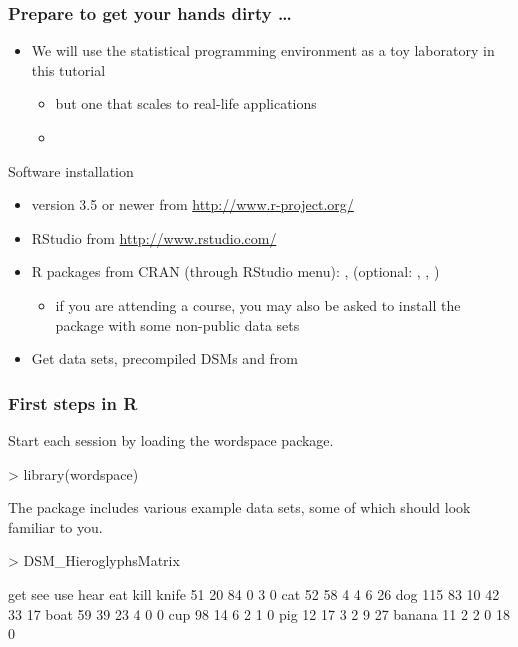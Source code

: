 \documentclass[t]{beamer} %
\begin{document}
\begin{frame}
  \frametitle{Prepare to get your hands dirty \ldots}
  
  \begin{itemize}
  \item We will use the statistical programming environment \href{http://www.r-project.org/}{} as a toy laboratory in this tutorial
    \begin{itemize}
    \item[\hand] but one that scales to real-life applications
    \item[]
    \end{itemize}
  \end{itemize}

  Software installation
  \begin{itemize}
  \item {} version 3.5 or newer from \url{http://www.r-project.org/}
  \item RStudio from \url{http://www.rstudio.com/}
  \item R packages from CRAN (through RStudio menu):
    ,  (optional: , , )
    \begin{itemize}
    \item if you are attending a course, you may also be asked to install the  package with some non-public data sets
    \end{itemize}
  \item Get data sets, precompiled DSMs and  from\\ 
  \end{itemize}
\end{frame}

\begin{frame}[fragile]
  \frametitle{First steps in R}

Start each session by loading the wordspace package.
\begin{Rcode}
> library(wordspace)
\end{Rcode}


The package includes various example data sets, some of which should look familiar to you.
\begin{Rcode}
> DSM_HieroglyphsMatrix\begin{Rout}
       get see use hear eat kill
knife   51  20  84    0   3    0
cat     52  58   4    4   6   26
dog    115  83  10   42  33   17
boat    59  39  23    4   0    0
cup     98  14   6    2   1    0
pig     12  17   3    2   9   27
banana  11   2   2    0  18    0
\end{Rout}
\end{Rcode}

\end{frame}
\end{document}
